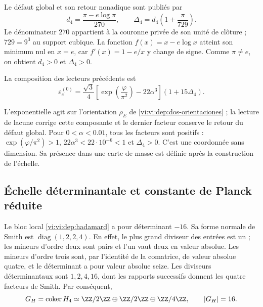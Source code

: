 Le défaut global et son retour nonadique sont publiés par
\begin{equation}
 d_4=\frac{\pi-e\log\pi}{270},\qquad
 \Delta_4=d_4\left(1+\frac{\pi}{729}\right).
 \label{vi:vi:dep:delta4}
\end{equation}
Le dénominateur \(270\) appartient à la couronne privée de son unité de
clôture ; \(729=9^3\) au support cubique. La fonction
\(f(x)=x-e\log x\) atteint son minimum nul en \(x=e\), car
\(f'(x)=1-e/x\) y change de signe. Comme \(\pi\ne e\),
on obtient \(d_4>0\) et \(\Delta_4>0\).

\begin{definition}
\label{vi:vi:dep:electron-basal}
La composition des lecteurs précédents est
\begin{equation}
 \varepsilon_e^{(0)}=
 \frac{\sqrt3}{4}
 \left[\exp\left(\frac{\varphi}{\pi^2}\right)-22\alpha^3\right]
 (1+15\Delta_4).
 \label{vi:vi:dep:formula-basal}
\end{equation}
\end{definition}
L'exponentielle agit sur l'orientation \(\rho_E\) de
\eqref{vi:vi:dep:dos-orientaciones} ; la lecture de lacune corrige cette
composante et le dernier facteur conserve le retour du défaut global.
Pour \(0<\alpha<0.01\), tous les facteurs sont positifs :
\(\exp(\varphi/\pi^2)>1\), \(22\alpha^3<22\cdot10^{-6}<1\)
et \(\Delta_4>0\). C'est une coordonnée sans dimension. Sa présence
dans une carte de masse est définie après la construction de l'échelle.

\subsection{Échelle déterminantale et constante de Planck réduite}
\label{vi:vi:dep:planck}

Le bloc local \eqref{vi:vi:dep:hadamard} a pour déterminant \(-16\).
Sa forme normale de Smith est \(\operatorname{diag}(1,2,2,4)\).
En effet, le plus grand diviseur des entrées est un ; les mineurs
d’ordre deux sont pairs et l’un vaut deux en valeur absolue. Les mineurs
d’ordre trois sont, par l’identité de la comatrice, de valeur absolue quatre,
et le déterminant a pour valeur absolue seize. Les diviseurs
déterminantaux sont \(1,2,4,16\), dont les rapports successifs donnent les
quatre facteurs de Smith. Par conséquent,
\begin{equation}
 G_H=\operatorname{coker}H_4
 \simeq\ZZ/2\ZZ\oplus\ZZ/2\ZZ\oplus\ZZ/4\ZZ,
 \qquad |G_H|=16.
 \label{vi:vi:dep:conucleo}
\end{equation}

